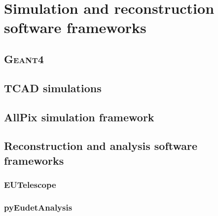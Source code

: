 \chapter{Simulation and reconstruction software frameworks}
\label{sec:Software}

\section{\textsc{Geant4}}\label{sec:Silicon_Geant4}
\section{TCAD simulations}
\section{AllPix simulation framework}
\label{sec:AllPix}
\section{Reconstruction and analysis software frameworks}
\label{sec:recoSoft}

\subsection{EUTelescope}
\subsection{pyEudetAnalysis}